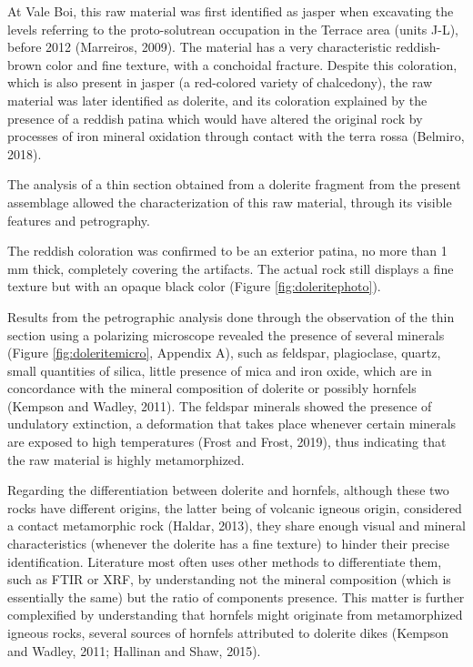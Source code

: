 \documentclass[12pt,twoside]{reedthesis}
\begin{document}
At Vale Boi, this raw material was first identified as jasper when excavating the levels referring to the proto-solutrean occupation in the Terrace area (units J-L), before 2012 (Marreiros, 2009). The material has a very characteristic reddish-brown color and fine texture, with a conchoidal fracture. Despite this coloration, which is also present in jasper (a red-colored variety of chalcedony), the raw material was later identified as dolerite, and its coloration explained by the presence of a reddish patina which would have altered the original rock by processes of iron mineral oxidation through contact with the terra rossa (Belmiro, 2018).

The analysis of a thin section obtained from a dolerite fragment from the present assemblage allowed the characterization of this raw material, through its visible features and petrography.

The reddish coloration was confirmed to be an exterior patina, no more than 1 mm thick, completely covering the artifacts. The actual rock still displays a fine texture but with an opaque black color (Figure \ref{fig:doleritephoto}).

Results from the petrographic analysis done through the observation of the thin section using a polarizing microscope revealed the presence of several minerals (Figure \ref{fig:doleritemicro}, Appendix A), such as feldspar, plagioclase, quartz, small quantities of silica, little presence of mica and iron oxide, which are in concordance with the mineral composition of dolerite or possibly hornfels (Kempson and Wadley, 2011). The feldspar minerals showed the presence of undulatory extinction, a deformation that takes place whenever certain minerals are exposed to high temperatures (Frost and Frost, 2019), thus indicating that the raw material is highly metamorphized.

Regarding the differentiation between dolerite and hornfels, although these two rocks have different origins, the latter being of volcanic igneous origin, considered a contact metamorphic rock (Haldar, 2013), they share enough visual and mineral characteristics (whenever the dolerite has a fine texture) to hinder their precise identification. Literature most often uses other methods to differentiate them, such as FTIR or XRF, by understanding not the mineral composition (which is essentially the same) but the ratio of components presence. This matter is further complexified by understanding that hornfels might originate from metamorphized igneous rocks, several sources of hornfels attributed to dolerite dikes (Kempson and Wadley, 2011; Hallinan and Shaw, 2015).
\end{document}
